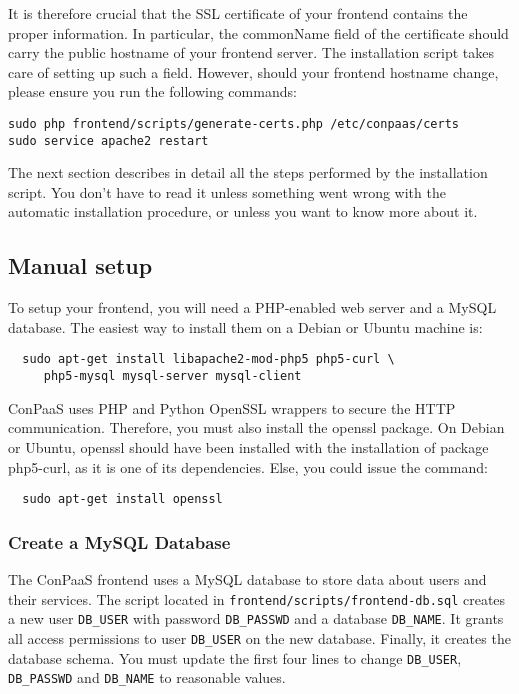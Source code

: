 \documentclass[10pt]{article}
\begin{document}
It is therefore crucial that the SSL certificate of your frontend contains the
proper information. In particular, the commonName field of the certificate
should carry the public hostname of your frontend server. The installation
script takes care of setting up such a field. However, should your frontend
hostname change, please ensure you run the following commands:

\begin{verbatim}
sudo php frontend/scripts/generate-certs.php /etc/conpaas/certs
sudo service apache2 restart
\end{verbatim}

The next section describes in detail all the steps performed by the
installation script. You don't have to read it unless something went wrong with
the automatic installation procedure, or unless you want to know more about it.

\subsection{Manual setup}
\label{sec:frontend-manual}
To setup your frontend, you will need a PHP-enabled web server and a
MySQL database. The easiest way to install them on a Debian or Ubuntu
machine is:

\begin{verbatim}
  sudo apt-get install libapache2-mod-php5 php5-curl \
     php5-mysql mysql-server mysql-client
\end{verbatim}

ConPaaS uses PHP and Python OpenSSL wrappers to secure the HTTP communication.
Therefore, you must also install the openssl package. On Debian or Ubuntu,
openssl should have been installed with the installation of
package php5-curl, as it is one of its dependencies. Else, you could issue
the command:

\begin{verbatim}
  sudo apt-get install openssl
\end{verbatim}

\subsubsection{Create a MySQL Database}

The ConPaaS frontend uses a MySQL database to store data about users
and their services. The script located in
\verb+frontend/scripts/frontend-db.sql+ creates a new user
\verb+DB_USER+ with password \verb+DB_PASSWD+ and a database
\verb+DB_NAME+. It grants all access permissions to user
\verb+DB_USER+ on the new database. Finally, it creates the database
schema. You must update the first four lines to change \verb+DB_USER+,
\verb+DB_PASSWD+ and \verb+DB_NAME+ to reasonable values.
\end{document}
